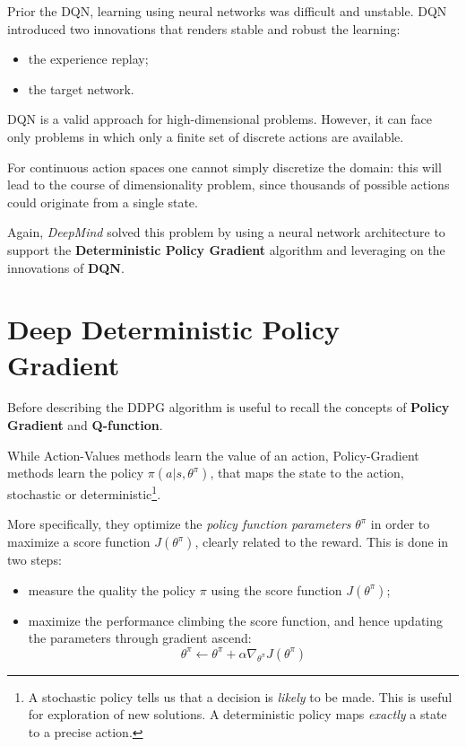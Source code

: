 \documentclass[10pt,a4paper]{scrartcl}
\begin{document}
Prior the DQN, learning using neural networks was difficult and unstable. DQN introduced two innovations that renders stable and robust the learning:
\begin{itemize}
	\item the experience replay;
	\item the target network.
\end{itemize} 

DQN is a valid approach for high-dimensional problems. However, it can face only problems in which only a finite set of discrete actions are available. 

For continuous action spaces one cannot simply discretize the domain: this will lead to the course of dimensionality problem, since thousands of possible actions could originate from a single state. 

Again, \textit{DeepMind} solved this problem by using a neural network architecture to support the \textbf{Deterministic Policy Gradient} algorithm and leveraging on the innovations of \textbf{DQN}.


\section{Deep Deterministic Policy Gradient}

Before describing the DDPG algorithm is useful to recall the concepts of \textbf{Policy Gradient} and \textbf{Q-function}.

While Action-Values methods learn the value of an action, Policy-Gradient methods learn the policy $ \pi(a|s,\theta^\pi) $, that maps the state to the action, stochastic or deterministic\footnote{A stochastic policy tells us that a decision is \textit{likely} to be made. This is useful for exploration of new solutions. A deterministic policy maps \textit{exactly} a state to a precise action.}. 

More specifically, they optimize the \textit{policy function parameters} $ \theta^\pi $ in order to maximize a score function $ J(\theta^\pi) $, clearly related to the reward. This is done in two steps:
\begin{itemize}
	\item measure the quality the policy $ \pi $ using the score function $ J(\theta^\pi) $;
	\item maximize the performance climbing the score function, and hence updating the parameters through gradient ascend: \begin{equation}
		\theta^\pi \leftarrow \theta^\pi +  \alpha \nabla_{\theta^\pi}J(\theta^\pi) \label{update_step}
	\end{equation}
\end{itemize}
\end{document}

